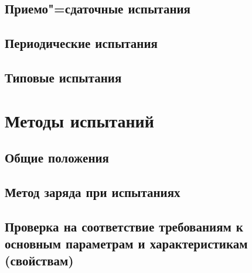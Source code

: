 \documentclass[columnsxxiv,columnsxxvii,pointsubsection]{eskdtext}
\begin{document}
%	
	
	\subsection{Приемо"=сдаточные испытания}
	\label{prav_psi}
	
	
	\subsection{Периодические испытания}
	\label{prav_pi}
	
	
	\subsection{Типовые испытания}
	\label{prav_tip}
	
	
%	
	
	\newpage
	\section{Методы испытаний}
	
	\subsection{Общие положения}
	\point
	
	\point
	\label{m_obsh2}
	
	\point
	\label{m_obsh3}
	
	\point
	\label{m_obsh4}
	
	
	\subsection{Метод заряда при испытаниях}
	\label{m_charge}
	
	                                                                                                                                                                              
	\subsection{Проверка на соответствие требованиям к основным параметрам и характеристикам (свойствам)}
%	
	\point
	\label{m_capacity}
	
	\point	
	\label{m_volt}
	
	\point	
	\label{m_undervolt}
	
	\point	
	\label{m_short}
	
	
\end{document}
